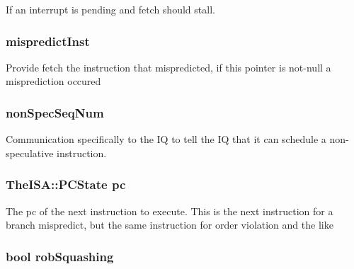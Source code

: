 If an interrupt is pending and fetch should stall. \hypertarget{structTimeBufStruct_1_1commitComm_a30072968ccd286f8f546aa26eb2c5c33}{
\subsubsection[{mispredictInst}]{ {\bf mispredictInst}}}
\label{structTimeBufStruct_1_1commitComm_a30072968ccd286f8f546aa26eb2c5c33}
Provide fetch the instruction that mispredicted, if this pointer is not-\/null a misprediction occured \hypertarget{structTimeBufStruct_1_1commitComm_a2109aaf648ce5c87f53ac688b4e51db1}{
\subsubsection[{nonSpecSeqNum}]{ {\bf nonSpecSeqNum}}}
\label{structTimeBufStruct_1_1commitComm_a2109aaf648ce5c87f53ac688b4e51db1}
Communication specifically to the IQ to tell the IQ that it can schedule a non-\/speculative instruction. \hypertarget{structTimeBufStruct_1_1commitComm_ad3585c83b0eac985107aa5a86e43e1b4}{
\subsubsection[{pc}]{\setlength{\rightskip}{0pt plus 5cm}TheISA::PCState {\bf pc}}}
\label{structTimeBufStruct_1_1commitComm_ad3585c83b0eac985107aa5a86e43e1b4}
The pc of the next instruction to execute. This is the next instruction for a branch mispredict, but the same instruction for order violation and the like \hypertarget{structTimeBufStruct_1_1commitComm_a897a27c9efdd9f32d97a34a08a529cfc}{
\subsubsection[{robSquashing}]{\setlength{\rightskip}{0pt plus 5cm}bool {\bf robSquashing}}}
